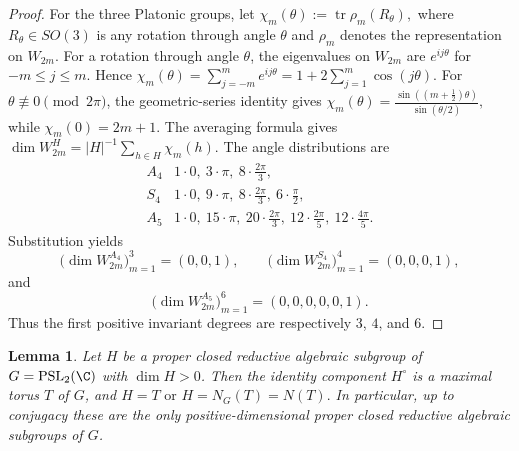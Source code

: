 \documentclass[12pt,leqno]{amsart}
\numberwithin{equation}{section} \newtheorem{thm}{Theorem}[section] \newtheorem{lem}[thm]{Lemma} \newtheorem{ex}[thm]{Example} \newtheorem{prop}[thm]{Proposition} \newtheorem{cor}[thm]{Corollary} \newtheorem{defi}[thm]{Definition} \newtheorem{rmk}[thm]{Remark} \newtheorem{notation}[thm]{Notation}
\newcommand{\PSLtwo}{\operatorname{PSL}_2(\C)}
\begin{document}
\begin{proof}
For the three Platonic groups, let $\chi_m(\theta):=\operatorname{tr}\rho_m(R_\theta),$ where $R_\theta\in SO(3)$ is any rotation through angle $\theta$ and $\rho_m$ denotes the representation on $W_{2m}$. For a rotation through angle \(\theta\), the eigenvalues on \(W_{2m}\) are \(e^{ij\theta}\) for \(-m\le j\le m\). Hence \(\chi_m(\theta)=\sum_{j=-m}^{m}e^{ij\theta}=1+2\sum_{j=1}^{m}\cos(j\theta).\) For \(\theta\not\equiv0\pmod{2\pi}\), the geometric-series identity gives \(\chi_m(\theta)=\frac{\sin((m+\tfrac12)\theta)}{\sin(\theta/2)},\) while \(\chi_m(0)=2m+1\). The averaging formula gives \(\dim W_{2m}^H=|H|^{-1}\sum_{h\in H}\chi_m(h)\). The angle distributions are
\[
\begin{array}{c|l}
A_4&1\cdot0,\ 3\cdot\pi,\ 8\cdot\frac{2\pi}{3},\\
S_4&1\cdot0,\ 9\cdot\pi,\ 8\cdot\frac{2\pi}{3},\ 6\cdot\frac{\pi}{2},\\
A_5&1\cdot0,\ 15\cdot\pi,\ 20\cdot\frac{2\pi}{3},\ 12\cdot\frac{2\pi}{5},\ 12\cdot\frac{4\pi}{5}.
\end{array}
\]
Substitution yields
\[
\bigl(\dim W_{2m}^{A_4}\bigr)_{m=1}^{3}=(0,0,1),\qquad \bigl(\dim W_{2m}^{S_4}\bigr)_{m=1}^{4}=(0,0,0,1),
\]
and
\[
\bigl(\dim W_{2m}^{A_5}\bigr)_{m=1}^{6}=(0,0,0,0,0,1).
\] Thus the first positive invariant degrees are respectively $3$, $4$, and $6$.
\end{proof}

\begin{lem}\label{lem:reductive-subgroups}
Let $H$ be a proper closed reductive algebraic subgroup of $G=\PSLtwo$ with $\dim H>0$. Then the identity component $H^\circ$ is a maximal torus $T$ of $G$, and \(H=T\text{ or }H=N_G(T)=N(T).\) In particular, up to conjugacy these are the only positive-dimensional proper closed reductive algebraic subgroups of $G$.
\end{lem}
\end{document}
